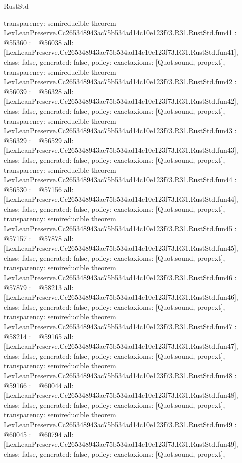 \begin{lexlean}{RustStd}
\begin{coremodule}
{  transparency: semireducible
}
theorem LexLeanPreserve.Cc265348943ac75b534ad14c10e123f73.R31.RustStd.fun41 : @55360 := @56038 {
  all: [LexLeanPreserve.Cc265348943ac75b534ad14c10e123f73.R31.RustStd.fun41],
  class: false,
  generated: false,
  policy: exact{axioms: [Quot.sound, propext]},
  transparency: semireducible
}
theorem LexLeanPreserve.Cc265348943ac75b534ad14c10e123f73.R31.RustStd.fun42 : @56039 := @56328 {
  all: [LexLeanPreserve.Cc265348943ac75b534ad14c10e123f73.R31.RustStd.fun42],
  class: false,
  generated: false,
  policy: exact{axioms: [Quot.sound, propext]},
  transparency: semireducible
}
theorem LexLeanPreserve.Cc265348943ac75b534ad14c10e123f73.R31.RustStd.fun43 : @56329 := @56529 {
  all: [LexLeanPreserve.Cc265348943ac75b534ad14c10e123f73.R31.RustStd.fun43],
  class: false,
  generated: false,
  policy: exact{axioms: [Quot.sound, propext]},
  transparency: semireducible
}
theorem LexLeanPreserve.Cc265348943ac75b534ad14c10e123f73.R31.RustStd.fun44 : @56530 := @57156 {
  all: [LexLeanPreserve.Cc265348943ac75b534ad14c10e123f73.R31.RustStd.fun44],
  class: false,
  generated: false,
  policy: exact{axioms: [Quot.sound, propext]},
  transparency: semireducible
}
theorem LexLeanPreserve.Cc265348943ac75b534ad14c10e123f73.R31.RustStd.fun45 : @57157 := @57878 {
  all: [LexLeanPreserve.Cc265348943ac75b534ad14c10e123f73.R31.RustStd.fun45],
  class: false,
  generated: false,
  policy: exact{axioms: [Quot.sound, propext]},
  transparency: semireducible
}
theorem LexLeanPreserve.Cc265348943ac75b534ad14c10e123f73.R31.RustStd.fun46 : @57879 := @58213 {
  all: [LexLeanPreserve.Cc265348943ac75b534ad14c10e123f73.R31.RustStd.fun46],
  class: false,
  generated: false,
  policy: exact{axioms: [Quot.sound, propext]},
  transparency: semireducible
}
theorem LexLeanPreserve.Cc265348943ac75b534ad14c10e123f73.R31.RustStd.fun47 : @58214 := @59165 {
  all: [LexLeanPreserve.Cc265348943ac75b534ad14c10e123f73.R31.RustStd.fun47],
  class: false,
  generated: false,
  policy: exact{axioms: [Quot.sound, propext]},
  transparency: semireducible
}
theorem LexLeanPreserve.Cc265348943ac75b534ad14c10e123f73.R31.RustStd.fun48 : @59166 := @60044 {
  all: [LexLeanPreserve.Cc265348943ac75b534ad14c10e123f73.R31.RustStd.fun48],
  class: false,
  generated: false,
  policy: exact{axioms: [Quot.sound, propext]},
  transparency: semireducible
}
theorem LexLeanPreserve.Cc265348943ac75b534ad14c10e123f73.R31.RustStd.fun49 : @60045 := @60794 {
  all: [LexLeanPreserve.Cc265348943ac75b534ad14c10e123f73.R31.RustStd.fun49],
  class: false,
  generated: false,
  policy: exact{axioms: [Quot.sound, propext]},
}
\end{coremodule}
\end{lexlean}
